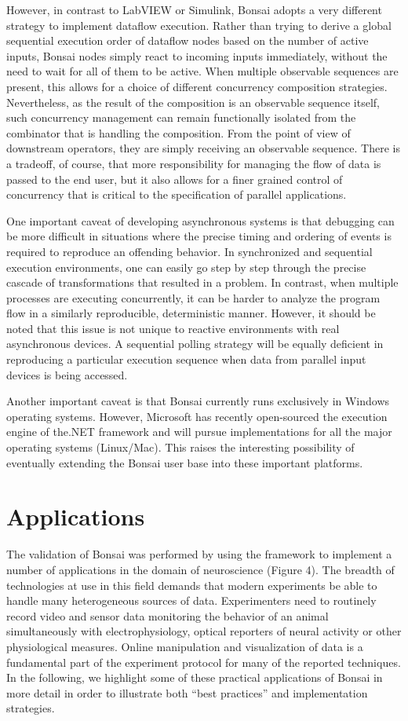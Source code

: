 However, in contrast to LabVIEW or Simulink, Bonsai adopts a very different strategy to implement dataflow execution. Rather than trying to derive a global sequential execution order of dataflow nodes based on the number of active inputs, Bonsai nodes simply react to incoming inputs immediately, without the need to wait for all of them to be active. When multiple observable sequences are present, this allows for a choice of different concurrency composition strategies. Nevertheless, as the result of the composition is an observable sequence itself, such concurrency management can remain functionally isolated from the combinator that is handling the composition. From the point of view of downstream operators, they are simply receiving an observable sequence. There is a tradeoff, of course, that more responsibility for managing the flow of data is passed to the end user, but it also allows for a finer grained control of concurrency that is critical to the specification of parallel applications.

One important caveat of developing asynchronous systems is that debugging can be more difficult in situations where the precise timing and ordering of events is required to reproduce an offending behavior. In synchronized and sequential execution environments, one can easily go step by step through the precise cascade of transformations that resulted in a problem. In contrast, when multiple processes are executing concurrently, it can be harder to analyze the program flow in a similarly reproducible, deterministic manner. However, it should be noted that this issue is not unique to reactive environments with real asynchronous devices. A sequential polling strategy will be equally deficient in reproducing a particular execution sequence when data from parallel input devices is being accessed.

Another important caveat is that Bonsai currently runs exclusively in Windows operating systems. However, Microsoft has recently open-sourced the execution engine of the.NET framework and will pursue implementations for all the major operating systems (Linux/Mac). This raises the interesting possibility of eventually extending the Bonsai user base into these important platforms.

\section{Applications}

The validation of Bonsai was performed by using the framework to implement a number of applications in the domain of neuroscience (Figure 4). The breadth of technologies at use in this field demands that modern experiments be able to handle many heterogeneous sources of data. Experimenters need to routinely record video and sensor data monitoring the behavior of an animal simultaneously with electrophysiology, optical reporters of neural activity or other physiological measures. Online manipulation and visualization of data is a fundamental part of the experiment protocol for many of the reported techniques. In the following, we highlight some of these practical applications of Bonsai in more detail in order to illustrate both “best practices” and implementation strategies.

